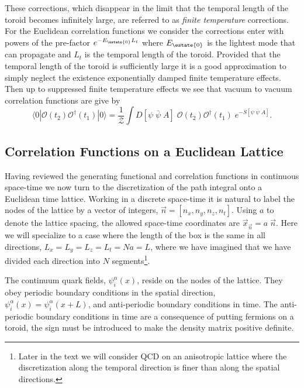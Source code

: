 These corrections, which disappear in the limit that the temporal length of the toroid becomes infinitely large, are referred to as \emph{finite temperature} corrections. For the Euclidean correlation functions we consider the corrections enter with powers of the pre-factor $e^{-E_{\estate{0}}L_t}$ where $E_{\estate{0}}$ is the lightest mode that can propagate and $L_t$ is the temporal length of the toroid. Provided that the temporal length of the toroid is sufficiently large it is a good approximation to simply neglect the existence exponentially damped finite temperature effects. Then up to suppressed finite temperature effects we see that vacuum to vacuum correlation functions are give by 
\begin{equation*}
\langle 0 | \mathcal{O}(t_2) \mathcal{O}^\dagger(t_1) | 0 \rangle  = \frac{1}{\mathcal{Z}} \int D[\psi \; \bar{\psi} \;A] \;  \mathcal{O}(t_2) \mathcal{O}^\dagger(t_1) \; e^{-S[\psi \;\bar{\psi}\;A]}.
\end{equation*} 




\subsection{Correlation Functions on a Euclidean Lattice} \label{QCD::lattice_correlators}

Having reviewed the generating functional and correlation functions in continuous space-time we now turn to the discretization of the path integral onto a Euclidean time lattice. Working in a discrete space-time it is natural to label the nodes of the lattice by a vector of integers, $\vec{n} = [n_x , n_y , n_z , n_t]$. Using $a$ to denote the lattice spacing, the allowed space-time coordinates are $\vec{x}_{\vec{n}} = a\;\vec{n}$. Here we will specialize to a case where the length of the box is the same in all directions, $L_{x}= L_{y} = L_z = L_t = N a = L$, where we have imagined that we have divided each direction into $N$ segments\footnote{Later in the text we will consider QCD on an anisotropic lattice where the discretization along the temporal direction is finer than along the spatial directions.}. 

The continuum quark fields, $\psi^\alpha_i(x)$, reside on the nodes of the lattice. They obey periodic boundary conditions in the spatial direction,  $\psi^\alpha_i(x) = \psi^\alpha_i(x + L)$, and anti-periodic boundary conditions in time. The anti-periodic boundary conditions in time are a consequence of putting fermions on a toroid, the sign must be introduced to make the density matrix positive definite. 

